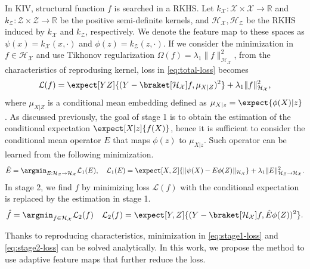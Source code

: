 In KIV, structural function $f$ is searched in a RKHS. Let $k_\mathcal{X}:\mathcal{X} \times \mathcal{X} \to \mathbb{R}$ and $k_\mathcal{Z}:\mathcal{Z} \times \mathcal{Z} \to \mathbb{R}$ be the positive semi-definite kernels, and $\mathcal{H}_\mathcal{X}, \mathcal{H}_\mathcal{Z}$ be the RKHS induced by $k_\mathcal{X}$ and $k_\mathcal{Z}$, respectively. We denote the feature map to these spaces as $\psi(x) = k_\mathcal{X}(x,\cdot)$ and  $\phi(z) = k_\mathcal{Z}(z,\cdot)$. If we consider the minimization in $f \in \mathcal{H}_\mathcal{X}$ and use Tikhonov regularization $\Omega(f) = \lambda_1\|f\|^2_{\mathcal{H}_\mathcal{X}}$, from the characteristics of reprodusing kernel, loss in \eqref{eq:total-loss} becomes
\begin{align*}
    \mathcal{L}(f) = \expect[YZ]{(Y - \braket[{\mathcal{H}_\mathcal{X}}]{f, \mu_{X|Z}})^2} + \lambda_1\|f\|^2_{\mathcal{H}_\mathcal{X}}, 
\end{align*} 
where $\mu_{X|Z}$ is a conditional mean embedding defined as $\mu_{X|z} = \expect{\phi(X) | z}$. As discussed previously, the goal of stage 1 is to obtain the estimation of the conditional expectation $\expect[X|z]{f(X)}$, hence it is sufficient to consider the conditional mean operator $E$ that maps $\phi(z)$ to $\mu_{X|z}$. Such operator can be learned from the following minimization.
\begin{align}
    \hat{E} = \argmin_{E: \mathcal{H}_\mathcal{Z} \to \mathcal{H}_\mathcal{X}} \mathcal{L}_1(E), \quad
    \mathcal{L}_1(E) = \expect[X,Z]{\|\psi(X) - E \phi(Z)\|_{\mathcal{H}_\mathcal{X}}} + \lambda_1 \|E\|_{\mathcal{H}_\mathcal{Z} \to \mathcal{H}_\mathcal{X}}^2. \label{eq:stage1-loss}
\end{align}
In stage 2, we find $f$ by minimizing loss $\mathcal{L}(f)$ with the conditional expectation is replaced by the estimation in stage 1.
\begin{align}
    \hat{f} = \argmin_{f\in\mathcal{H}_\mathcal{X}} \mathcal{L}_2(f)\quad \mathcal{L}_2(f) = \expect[Y,Z]{(Y -  \braket[{\mathcal{H}_\mathcal{X}}]{f, \hat{E}\phi(Z)})^2}. \label{eq:stage2-loss}
\end{align}

Thanks to reproducing characteristics, minimization in \eqref{eq:stage1-loss} and \eqref{eq:stage2-loss} can be solved analytically. In this work, we propose the method to use adaptive feature maps that further reduce the loss.

